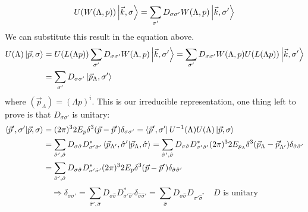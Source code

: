 \documentclass[../main.tex]{subfiles}
\begin{document}
\[
U(W(\Lambda,p))\ket{\vec{k},\sigma}=\sum_{\sigma'}D_{\sigma\sigma'}W(\Lambda,p)\ket{\vec{k},\sigma'}
\]
We can substitute this result in the equation above.
\begin{align*}
U(\Lambda)\ket{\vec{p},\sigma}&=U(L(\Lambda p))\sum_{\sigma'}D_{\sigma\sigma'}W(\Lambda,p)\ket{\vec{k},\sigma'}=\sum_{\sigma'}D_{\sigma\sigma'}W(\Lambda,p)U(L(\Lambda p))\ket{\vec{k},\sigma'}\\
&=\sum_{\sigma'}D_{\sigma\sigma'}\ket{\vec{p}_\Lambda,\sigma'}
\end{align*}
where $(\vec{p}_\Lambda)=(\Lambda p)^i$. This is our irreducible representation, one thing left to prove is that $D_{\sigma\sigma'}$ is unitary:
\begin{align*}
\bra{\vec{p}',\sigma'}\ket{\vec{p},\sigma}&=(2\pi)^32E_p\delta^3(\vec{p}-\vec{p}')\delta_{\sigma\sigma'}=\bra{\vec{p}',\sigma'}U^{-1}(\Lambda)U(\Lambda)\ket{\vec{p},\sigma}\\
&=\sum_{\hat{\sigma}',\hat{\sigma}}D_{\sigma\hat{\sigma}}D_{\sigma'\hat{\sigma}'}^*\bra{\vec{p}_{\Lambda'},\hat{\sigma}'}\ket{\vec{p}_\Lambda,\hat{\sigma}}=\sum_{\hat{\sigma}',\hat{\sigma}}D_{\sigma\hat{\sigma}}D_{\sigma'\hat{\sigma}'}^*(2\pi)^32E_{p_{\Lambda}}\delta^3(\vec{p}_\Lambda-\vec{p}'_{\Lambda'})\delta_{\hat{\sigma}\hat{\sigma}'}\\
&=\sum_{\hat{\sigma}',\hat{\sigma}}D_{\sigma\hat{\sigma}}D_{\sigma'\hat{\sigma}'}^*(2\pi)^32E_p\delta^3(\vec{p}-\vec{p}')\delta_{\hat{\sigma}\hat{\sigma}'}
\end{align*}
\[
\Rightarrow \delta_{\sigma\sigma'}=\sum_{\hat{\sigma}',\hat{\sigma}}D_{\sigma\hat{\sigma}}D_{\sigma'\hat{\sigma}'}^*\delta_{\hat{\sigma}\hat{\sigma}'}=\sum_{\hat{\sigma}}D_{\sigma\hat{\sigma}}D_{\sigma'\hat{\sigma}^*} \quad \text{$D$ is unitary}
\]
\end{document}
